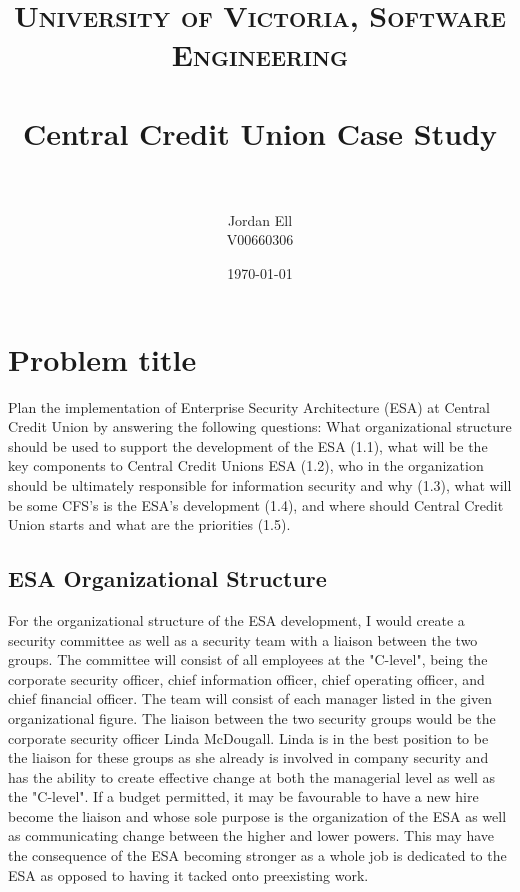 \documentclass[paper=a4, fontsize=11pt]{scrartcl} %
\title{	
\normalfont \normalsize 
\textsc{University of Victoria, Software Engineering} \\ [25pt] %
\horrule{0.5pt} \\[0.4cm] %
\huge Central Credit Union Case Study \\ %
\horrule{2pt} \\[0.5cm] %
}
\author{Jordan Ell\\
V00660306} %
\date{\normalsize\today} %
\numberwithin{equation}{section} %
\numberwithin{figure}{section} %
\numberwithin{table}{section} %
\begin{document}
\maketitle %


\section{Problem title}

Plan the implementation of Enterprise Security Architecture (ESA) at Central 
Credit Union by answering the following questions: What organizational 
structure should be used to support the development of the ESA (1.1), what will
be the key components to Central Credit Unions ESA (1.2), who in the organization
should be ultimately responsible for information security and why (1.3), what
will be some CFS's is the ESA's development (1.4), and where should Central 
Credit Union starts and what are the priorities (1.5).


\subsection{ESA Organizational Structure}
For the organizational structure of the ESA development, I would create a
security committee as well as a security team with a liaison between the 
two groups. The committee
will consist of all employees at the "C-level", being the corporate security
officer, chief information officer, chief operating officer, and chief
financial officer. The team will consist of each manager listed in the given
organizational figure. The liaison between the two security groups would be 
the corporate security officer Linda McDougall. Linda is in the best position
to be the liaison for these groups as she already is involved in company security
and has the ability to create effective change at both the managerial level
as well as the "C-level". If a budget permitted, it may be favourable to have
a new hire become the liaison and whose sole purpose is the organization of the
ESA as well as communicating change between the higher and lower powers. This
may have the consequence of the ESA becoming stronger as a whole job is dedicated
to the ESA as opposed to having it tacked onto preexisting work.
\end{document}
